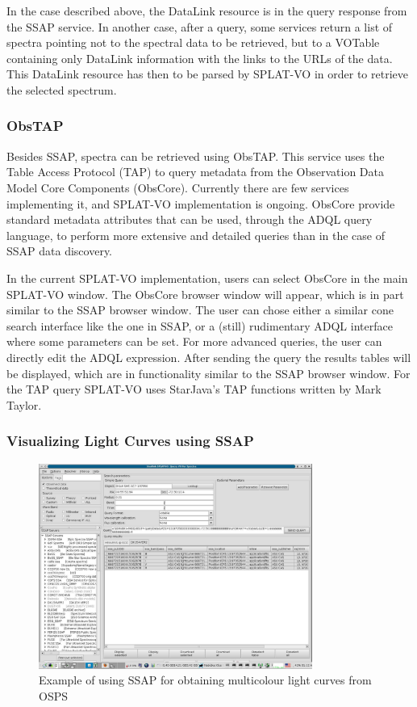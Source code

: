\documentclass[final,authoryear,5p,times,twocolumn]{elsarticle}
\begin{document}
In the case described above, the DataLink resource is in the query
response from the SSAP service. In another case, after a query, some
services return a list of spectra pointing not to the spectral data to
be retrieved, but to a VOTable containing only DataLink information
with the links to the URLs of the data. This DataLink resource has
then to be parsed by SPLAT-VO in order to retrieve the selected spectrum.

\subsubsection{ObsTAP}

Besides SSAP, spectra can be retrieved using ObsTAP. This service uses
the Table Access Protocol (TAP) to query metadata from the Observation
Data Model Core Components (ObsCore). Currently there are few services
implementing it, and SPLAT-VO implementation is ongoing.  ObsCore
provide standard metadata attributes that can be used, through the
ADQL query language, to perform more extensive and detailed queries
than in the case of SSAP data discovery.

In the current SPLAT-VO implementation, users can select ObsCore in the
main SPLAT-VO window. The ObsCore browser window will appear, which is in
part similar to the SSAP browser window. The user can chose either a
similar cone search interface like the one in SSAP, or a (still)
rudimentary ADQL interface where some parameters can be set. For more
advanced queries, the user can directly edit the ADQL
expression. After sending the query the results tables will be
displayed, which are in functionality similar to the SSAP browser
window. For the TAP query SPLAT-VO uses StarJava's TAP functions written
by Mark Taylor.


\subsubsection{Visualizing Light Curves using  SSAP}

\begin{figure}[t]
\begin{center}
\includegraphics[width=0.8\textwidth]{OGLE-SC7-127550_query.pdf}
\caption{Example of using SSAP for obtaining multicolour light curves from OSPS}
\label{fig:OGLE-SC7-127550_query}
\end{center}
\end{figure}
\end{document}
